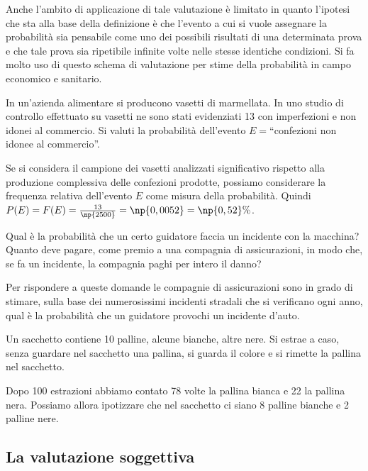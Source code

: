 Anche l'ambito di applicazione di tale valutazione è limitato in quanto l'ipotesi che sta alla base della definizione è che l'evento a cui si vuole assegnare la probabilità sia pensabile come uno dei possibili risultati di una determinata prova e che tale prova sia ripetibile infinite volte nelle stesse identiche condizioni.
Si fa molto uso di questo schema di valutazione per stime della probabilità in campo economico e sanitario.

\begin{exrig}
\begin{esempio}
In un'azienda alimentare si producono vasetti di marmellata. In uno studio di controllo effettuato su  vasetti ne sono stati evidenziati 13 con imperfezioni e non idonei al commercio. Si valuti la probabilità dell'evento $E=$``confezioni non idonee al commercio''.

Se si considera il campione dei vasetti analizzati significativo rispetto alla produzione complessiva delle confezioni prodotte, possiamo considerare la frequenza relativa dell'evento $E$ come misura della probabilità. Quindi $P(E)=F(E)=\frac{13}{\np{2500}}=\np{0,0052}=\np{0,52}\%$.
\end{esempio}

\begin{esempio}
Qual è la probabilità che un certo guidatore faccia un incidente con la macchina? Quanto deve pagare, come premio a una compagnia di assicurazioni, in modo che, se fa un incidente, la compagnia paghi per intero il danno?

Per rispondere a queste domande le compagnie di assicurazioni sono in grado di stimare, sulla base dei numerosissimi incidenti stradali che si verificano ogni anno, qual è la probabilità che un guidatore provochi un incidente d'auto.
\end{esempio}

\begin{esempio}
Un sacchetto contiene 10 palline, alcune bianche, altre nere. Si estrae a caso, senza guardare nel sacchetto una pallina, si guarda il colore e si rimette la pallina nel sacchetto.

Dopo 100 estrazioni abbiamo contato 78 volte la pallina bianca e 22 la pallina nera. Possiamo allora ipotizzare che nel sacchetto ci siano 8 palline bianche e 2 palline nere.
\end{esempio}
\end{exrig}

\subsection{La valutazione soggettiva}

